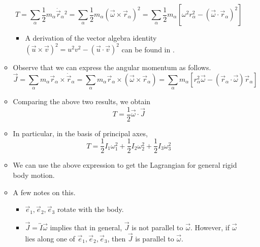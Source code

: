\documentclass[../notes.tex]{subfiles}
\begin{document}
\begin{itemize}
\begin{itemize}
        \begin{equation*}
            T = \sum_\alpha\frac{1}{2}m_\alpha\dot{\vec{r}}_\alpha{}^2
            = \sum_\alpha\frac{1}{2}m_\alpha(\vec{\omega}\times\vec{r}_\alpha)^2
            = \sum_\alpha\frac{1}{2}m_\alpha[\omega^2r_\alpha^2-(\vec{\omega}\cdot\vec{r}_\alpha)^2]
        \end{equation*}
        \begin{itemize}
            \item A derivation of the vector algebra identity $(\vec{u}\times\vec{v})^2=u^2v^2-(\vec{u}\cdot\vec{v})^2$ can be found in \textcite{bib:KibbleBerkshire}.
        \end{itemize}
        \item Observe that we can express the angular momentum as follows.
        \begin{equation*}
            \vec{J} = \sum_\alpha m_\alpha\vec{r}_\alpha\times\dot{\vec{r}}_\alpha
            = \sum_\alpha m_\alpha\vec{r}_\alpha\times(\vec{\omega}\times\vec{r}_\alpha)
            = \sum_\alpha m_\alpha[r_\alpha^2\vec{\omega}-(\vec{r}_\alpha\cdot\vec{\omega})\vec{r}_\alpha]
        \end{equation*}
        \item Comparing the above two results, we obtain
        \begin{equation*}
            T = \frac{1}{2}\vec{\omega}\cdot\vec{J}
        \end{equation*}
        \item In particular, in the basis of principal axes,
        \begin{equation*}
            T = \frac{1}{2}I_1\omega_1^2+\frac{1}{2}I_2\omega_2^2+\frac{1}{2}I_3\omega_3^2
        \end{equation*}
        \item We can use the above expression to get the Lagrangian for general rigid body motion.
        \item A few notes on this.
        \begin{itemize}
            \item $\vec{e}_1,\vec{e}_2,\vec{e}_3$ rotate with the body.
            \item $\vec{J}=\overleftrightarrow{I}\vec{\omega}$ implies that in general, $\vec{J}$ is not parallel to $\vec{\omega}$. However, if $\vec{\omega}$ lies along one of $\vec{e}_1,\vec{e}_2,\vec{e}_3$, then $\vec{J}$ is parallel to $\vec{\omega}$.
        \end{itemize}
    \end{itemize}

\end{itemize}
\end{document}
